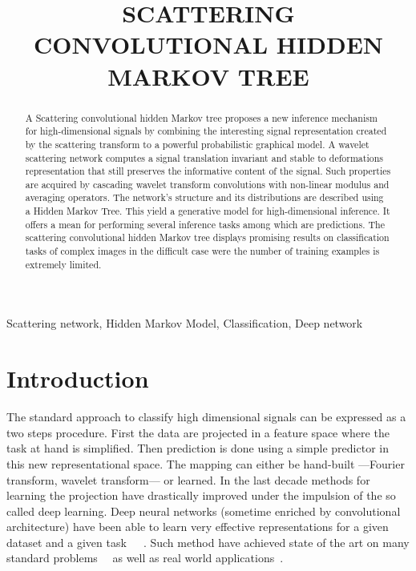 \documentclass{article}
\title{SCATTERING CONVOLUTIONAL HIDDEN MARKOV TREE}
\begin{document}
%
\maketitle
%
\begin{abstract}
  A Scattering convolutional hidden Markov tree proposes a new inference mechanism for high-dimensional signals by combining the interesting signal representation created by the scattering transform to a powerful probabilistic graphical model.
  A wavelet scattering network computes a signal translation invariant and stable to deformations representation that still preserves the informative content of the signal. Such properties are acquired by cascading wavelet transform convolutions with non-linear modulus and averaging operators.
  The network's structure and its distributions are described using a Hidden Markov Tree. This yield a generative model for high-dimensional inference. It offers a mean for performing several inference tasks among which are predictions. The scattering convolutional hidden Markov tree displays promising results on classification tasks of complex images in the difficult case were the number of training examples is extremely limited.
\end{abstract}
%
\begin{keywords}
  Scattering network, Hidden Markov Model, Classification, Deep network
\end{keywords}
%
\section{Introduction}
\label{sec:Intro}

  The standard approach to classify high dimensional signals can be expressed as a two steps procedure. First the data are projected in a feature space where the task at hand is simplified. Then prediction is done using a simple predictor in this new representational space. The mapping can either be hand-built ---\eg Fourier transform, wavelet transform--- or learned. In the last decade methods for learning the projection have drastically improved under the impulsion of the so called deep learning. Deep neural networks (sometime enriched by convolutional architecture) have been able to learn very effective representations for a given dataset and a given task~\cite{salakhutdinov2009deep}~\cite{vincent2010stacked}~\cite{lecun1995convolutional}. Such method have achieved state of the art on many standard problems~\cite{krizhevsky2012imagenet}~\cite{hinton2012improving} as well as real world applications~\cite{huval2015empirical}. 
  
\end{document}
